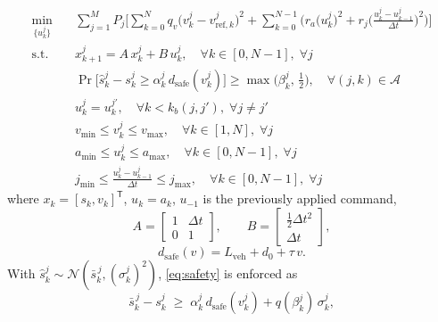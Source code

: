 \documentclass[letterpaper, 10 pt, journal]{IEEEtran}
\begin{document}
\begin{subequations} \label{eq:mpc_problem}
\begin{align}
    \min_{\{u^j_k\}} \quad
    & \sum_{j=1}^{M} P_j
      \Bigg[
        \sum_{k=0}^{N} q_v \big(v^j_k - v^j_{\mathrm{ref},k}\big)^2
        + \sum_{k=0}^{N-1} \bigg(
            r_a \big(u^j_k\big)^2
            + r_j \bigg(\frac{u^j_k - u^j_{k-1}}{\Delta t}\bigg)^2
          \bigg)
      \Bigg]
      \label{eq:cost} \\
    \textrm{s.t.} \quad
    & x^j_{k+1} = A\,x^j_k + B\,u^j_k,
      \quad \forall k \in [0, N-1],\; \forall j
      \label{eq:dynamics} \\
    & \Pr\!\Big[\hat s^j_k - s^j_k \ge \alpha^j_k\, d_{\mathrm{safe}}(v^j_k)\Big]
      \ge \max\!\big(\beta^j_k,\, \tfrac{1}{2}\big),
      \quad \forall (j,k) \in \mathcal{A}
      \label{eq:safety} \\
    & u^j_k = u^{j'}_k,
      \quad \forall k < k_b(j,j'), \;
      \forall j \neq j'
      \label{eq:branch_nac} \\
    & v_{\min} \le v^j_k \le v_{\max},
      \quad \forall k \in [1, N], \; \forall j
      \label{eq:state_bound} \\
    & a_{\min} \le u^j_k \le a_{\max},
      \quad \forall k \in [0, N-1], \; \forall j
      \label{eq:input_bound} \\
    & j_{\min} \le \frac{u^j_k - u^j_{k-1}}{\Delta t} \le j_{\max},
      \quad \forall k \in [0, N-1], \; \forall j
      \label{eq:jerk_bound}
\end{align}
\end{subequations}
where $x_k = [s_k, v_k]^\mathsf{T}$, $u_k = a_k$, $u_{-1}$ is the previously applied command,
\begin{equation}
    A = \begin{bmatrix} 1 & \Delta t \\ 0 & 1 \end{bmatrix}, \qquad
    B = \begin{bmatrix} \tfrac{1}{2}\Delta t^2 \\ \Delta t \end{bmatrix},
    \label{eq:ab}
\end{equation}
\begin{equation}
    d_{\mathrm{safe}}(v) = L_{\mathrm{veh}} + d_0 + \tau\, v .
    \label{eq:dsafe}
\end{equation}
With $\hat s^j_k \sim \mathcal{N}(\bar s^{\,j}_k, (\sigma^j_k)^2)$, \eqref{eq:safety} is enforced as
\begin{equation}
    \bar s^{\,j}_k - s^j_k \;\ge\; \alpha^j_k\, d_{\mathrm{safe}}(v^j_k) + q(\beta^j_k)\,\sigma^j_k,
    \label{eq:safety_det}
\end{equation}
\end{document}
